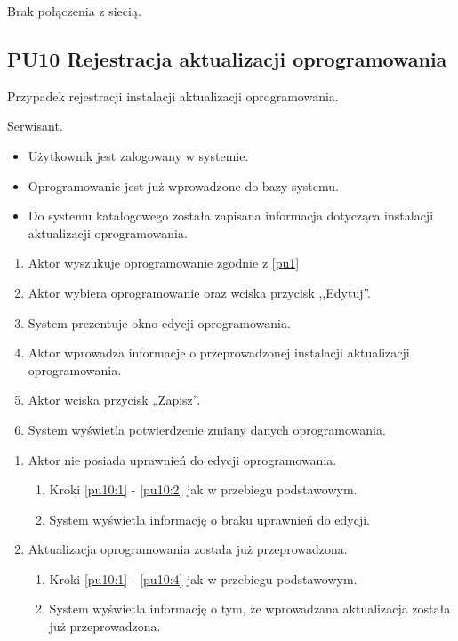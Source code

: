 Brak połączenia z siecią.

\subsection{PU10 Rejestracja aktualizacji oprogramowania} \label{pu10}
Przypadek rejestracji instalacji aktualizacji oprogramowania.

Serwisant.

\begin{itemize}
\item Użytkownik jest zalogowany w systemie.
\item Oprogramowanie jest już wprowadzone do bazy systemu.
\end{itemize}

\begin{itemize}
\item Do systemu katalogowego została zapisana informacja dotycząca instalacji aktualizacji oprogramowania.
\end{itemize}

\begin{enumerate}
	\item \label{pu10:1} Aktor wyszukuje oprogramowanie zgodnie z \ref{pu1}
	\item \label{pu10:2} Aktor wybiera oprogramowanie oraz wciska przycisk ,,Edytuj''.
	\item System prezentuje okno edycji oprogramowania.
	\item \label{pu10:4} Aktor wprowadza informacje o przeprowadzonej instalacji aktualizacji oprogramowania.
	\item Aktor wciska przycisk „Zapisz”.
	\item System wyświetla potwierdzenie zmiany danych oprogramowania.
\end{enumerate}

\begin{enumerate}
	\item Aktor nie posiada uprawnień do edycji oprogramowania.
	\begin{enumerate}[label*=\arabic*.]
		\item Kroki \ref{pu10:1} - \ref{pu10:2} jak w przebiegu podstawowym.
		\item System wyświetla informację o braku uprawnień do edycji.
	\end{enumerate}
	\item Aktualizacja oprogramowania została już przeprowadzona.
	\begin{enumerate}[label*=\arabic*.]
		\item Kroki \ref{pu10:1} - \ref{pu10:4} jak w przebiegu podstawowym.
		\item System wyświetla informację o tym, że wprowadzana aktualizacja została już przeprowadzona.
	\end{enumerate}
\end{enumerate}

